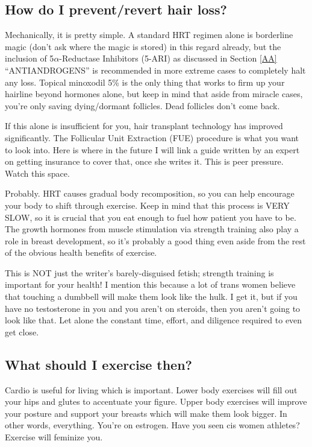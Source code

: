\documentclass{article}
\begin{document}
\subsection{How do I prevent/revert hair loss?}\label{11-14}

Mechanically, it is pretty simple. A standard HRT regimen alone is borderline magic (don’t ask where the magic is stored) in this regard already, but the inclusion of 5$\alpha$-Reductase Inhibitors (5-ARI) as discussed in Section \ref{AA} “ANTIANDROGENS” is recommended in more extreme cases to completely halt any loss. Topical minoxodil 5\% is the only thing that works to firm up your hairline beyond hormones alone, but keep in mind that aside from miracle cases, you’re only saving dying/dormant follicles. Dead follicles don’t come back.

If this alone is insufficient for you, hair transplant technology has improved significantly. The Follicular Unit Extraction (FUE) procedure is what you want to look into. Here is where in the future I will link a guide written by an expert on getting insurance to cover that, once she writes it. This is peer pressure. Watch this space.


Probably. HRT causes gradual body recomposition, so you can help encourage your body to shift through exercise. Keep in mind that this process is VERY SLOW, so it is crucial that you eat enough to fuel how patient you have to be. The growth hormones from muscle stimulation via strength training also play a role in breast development, so it’s probably a good thing even aside from the rest of the obvious health benefits of exercise.

This is NOT just the writer’s barely-disguised fetish; strength training is important for your health! I mention this because a lot of trans women believe that touching a dumbbell will make them look like the hulk. I get it, but if you have no testosterone in you and you aren’t on steroids, then you aren’t going to look like that. Let alone the constant time, effort, and diligence required to even get close.

\subsection{What should I exercise then?}\label{11-16}

Cardio is useful for living which is important. Lower body exercises will fill out your hips and glutes to accentuate your figure. Upper body exercises will improve your posture and support your breasts which will make them look bigger. In other words, everything. You’re on estrogen. Have you seen cis women athletes? Exercise will feminize you.
\end{document}
